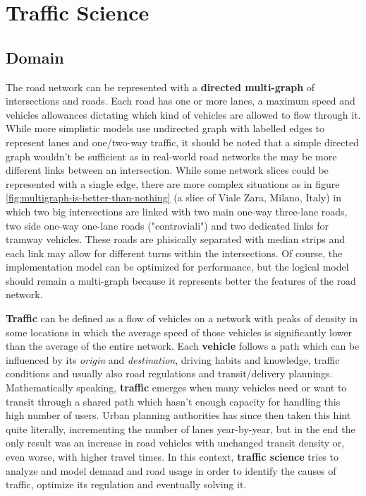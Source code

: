\chapter{Traffic Science}

\section{Domain}

The road network can be represented with a \textbf{directed multi-graph} of intersections and roads. Each road has one or more lanes, a maximum speed and vehicles allowances dictating which kind of vehicles are allowed to flow through it. While more simplistic models use undirected graph with labelled edges to represent lanes and one/two-way traffic, it should be noted that a simple directed graph wouldn't be sufficient as in real-world road networks the may be more different links between an intersection. While some network slices could be represented with a single edge, there are more complex situations as in figure \ref{fig:multigraph-is-better-than-nothing} (a slice of Viale Zara, Milano, Italy) in which two big intersections are linked with two main one-way three-lane roads, two side one-way one-lane roads ("controviali") and two dedicated links for tramway vehicles. These roads are phisically separated with median strips and each link may allow for different turns within the intersections. Of course, the implementation model can be optimized for performance, but the logical model should remain a multi-graph because it represents better the features of the road network.

\textbf{Traffic} can be defined as a flow of vehicles on a network with peaks of density in some locations in which the average speed of those vehicles is significantly lower than the average of the entire network.
Each \textbf{vehicle} follows a path which can be influenced by its \textit{origin} and \textit{destination}, driving habits and knowledge, traffic conditions and usually also road regulations and transit/delivery plannings.
Mathematically speaking, \textbf{traffic} emerges when many vehicles need or want to transit through a shared path which hasn't enough capacity for handling this high number of users.
Urban planning authorities has since then taken this hint quite literally, incrementing the number of lanes year-by-year, but in the end the only result was an increase in road vehicles with unchanged transit density or, even worse, with higher travel times.
In this context, \textbf{traffic science} tries to analyze and model demand and road usage in order to identify the causes of traffic, optimize its regulation and eventually solving it.




